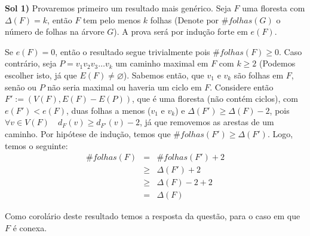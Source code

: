 
 {\bf Sol 1)} Provaremos primeiro um resultado mais genérico.
%
Seja $F$ uma floresta com $\Delta(F) = k$, então $F$ tem pelo menos $k$ folhas (Denote por $\# folhas(G)$ o número de folhas na árvore $G$). A prova será por indução forte em $e(F)$.

Se $e(F) = 0$, então o resultado segue trivialmente pois $\# folhas(F) \ge 0$.
%
Caso contrário, seja $P = v_1v_2v_3\ldots v_k$ um caminho maximal em $F$ com $k \ge 2$ (Podemos escolher isto, já que $E(F) \ne \varnothing$).
%
Sabemos então, que $v_1$ e $v_k$ são folhas em $F$, senão ou $P$ não seria maximal ou haveria um ciclo em $F$.
%
Considere então $F' := (V(F),E(F)-E(P))$, que é uma floresta (não contém ciclos), com $e(F') < e(F)$, duas folhas a menos ($v_1$ e $v_k$) e $\Delta(F') \ge \Delta(F) - 2$, pois $\forall v\in V(F)\quad d_F(v) \ge d_{F'}(v) - 2$, já que removemos as arestas de um caminho.
%
Por hipótese de indução, temos que $\# folhas(F') \ge \Delta(F')$.
%
Logo, temos o seguinte: 
\begin{eqnarray}
	\#folhas(F) &=& \# folhas(F') + 2  \nonumber \\
		  &\ge& \Delta(F') + 2 	   \nonumber \\
		  &\ge& \Delta(F) - 2 + 2  \nonumber \\
		    &=& \Delta(F) \nonumber
\end{eqnarray}
\fimprova

Como corolário deste resultado temos a resposta da questão, para o caso em que $F$ é conexa.\\

